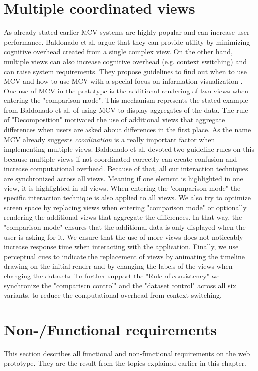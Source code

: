 \section{Multiple coordinated views}
As already stated earlier MCV systems are highly popular and can increase user performance. Baldonado et al. argue that they can provide utility
by minimizing cognitive overhead created from a single complex view. On the other hand, multiple views can also increase cognitive overhead
(e.g. context switching) and can raise system requirements. They propose guidelines to find out when to use MCV and how to use MCV
with a special focus on information visualization \citep*{WangBaldonado.2000}. One use of MCV in the prototype is the additional rendering of
two views when entering the "comparison mode". This mechanism represents the stated example from Baldonado et al. of using MCV to display
aggregates of the data. The rule of "Decomposition" motivated the use of additional views that aggregate differences when users are asked
about differences in the first place. As the name MCV already suggests \textit{coordination} is a really important factor when implementing
multiple views. Baldonado et al. devoted two guideline rules on this because multiple views if not coordinated correctly can create
confusion and increase computational overhead. Because of that, all our interaction techniques are synchronized across all views. Meaning if one
element is highlighted in one view, it is highlighted in all views. When entering the "comparison mode" the specific interaction technique
is also applied to all views. We also try to optimize screen space by replacing views when entering "comparison mode" or optionally rendering
the additional views that aggregate the differences. In that way, the "comparison mode" ensures that the additional data is only displayed when the
user is asking for it. We ensure that the use of more views does not noticeably increase
response time when interacting with the application. Finally, we use perceptual cues to indicate the replacement of views by animating
the timeline drawing on the initial render and by changing the labels of the views when changing the datasets. 
To further support the "Rule of consistency" we synchronize the "comparison control" and the "dataset control" across all six variants, to reduce
the computational overhead from context switching.

\section{Non-/Functional requirements}
This section describes all functional and non-functional requirements on the
web prototype. They are the result from the topics explained earlier in this chapter.

